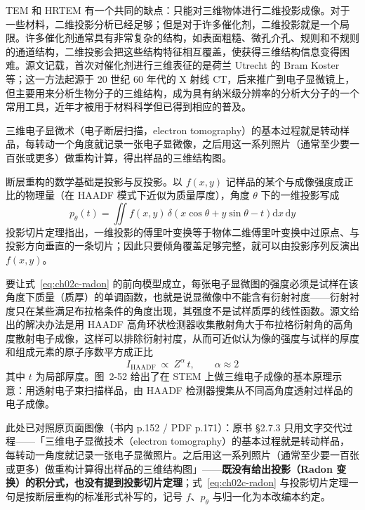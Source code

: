 TEM 和 HRTEM 有一个共同的缺点：只能对三维物体进行二维投影成像。对于一些材料，二维投影分析已经足够；但是对于许多催化剂，二维投影就是一个局限。许多催化剂通常具有非常复杂的结构，如表面粗糙、微孔介孔、规则和不规则的通道结构，二维投影会把这些结构特征相互覆盖，使获得三维结构信息变得困难。源文记载，首次对催化剂进行三维表征的是荷兰 Utrecht 的 Bram Koster 等；这一方法起源于 20 世纪 60 年代的 X 射线 CT，后来推广到电子显微镜上，但主要用来分析生物分子的三维结构，成为具有纳米级分辨率的分析大分子的一个常用工具，近年才被用于材料科学但已得到相应的普及。

三维电子显微术（电子断层扫描，electron tomography）的基本过程就是转动样品，每转动一个角度就记录一张电子显微像，之后用这一系列照片（通常至少要一百张或更多）做重构计算，得出样品的三维结构图。

\begin{principle}
断层重构的数学基础是投影与反投影。以 $f(x,y)$ 记样品的某个与成像强度成正比的物理量（在 HAADF 模式下近似为质量厚度），角度 $\theta$ 下的一维投影写成
\begin{equation}
p_\theta(t)=\iint f(x,y)\,\delta\!\left(x\cos\theta+y\sin\theta-t\right)\mathrm{d}x\,\mathrm{d}y
\label{eq:ch02c-radon}
\end{equation}
投影切片定理指出，一维投影的傅里叶变换等于物体二维傅里叶变换中过原点、与投影方向垂直的一条切片；因此只要倾角覆盖足够完整，就可以由投影序列反演出 $f(x,y)$。

要让式~\eqref{eq:ch02c-radon} 的前向模型成立，每张电子显微图的强度必须是试样在该角度下质量（质厚）的单调函数，也就是说显微像中不能含有衍射衬度——衍射衬度只在某些满足布拉格条件的角度出现，其强度不是试样质厚的线性函数。源文给出的解决办法是用 HAADF 高角环状检测器收集散射角大于布拉格衍射角的高角度散射电子成像，这样可以排除衍射衬度，从而可近似认为像的强度与试样的厚度和组成元素的原子序数平方成正比
\begin{equation}
I_{\mathrm{HAADF}}\ \propto\ Z^{\alpha}\,t,\qquad \alpha\approx 2
\label{eq:ch02c-haadf}
\end{equation}
其中 $t$ 为局部厚度。图~2-52 给出了在 STEM 上做三维电子成像的基本原理示意：用透射电子束扫描样品，由 HAADF 检测器搜集从不同高角度透射过样品的电子成像。
\end{principle}

此处已对照原页面图像（书内 p.152 / PDF p.171）：原书 §2.7.3 只用文字交代过程——「三维电子显微技术（electron tomography）的基本过程就是转动样品，每转动一角度就记录一张电子显微照片。之后用这一系列照片（通常至少要一百张或更多）做重构计算得出样品的三维结构图」——\textbf{既没有给出投影（Radon 变换）的积分式，也没有提到投影切片定理}；式~\eqref{eq:ch02c-radon} 与投影切片定理一句是按断层重构的标准形式补写的，记号 $f$、$p_\theta$ 与归一化为本改编本约定。

